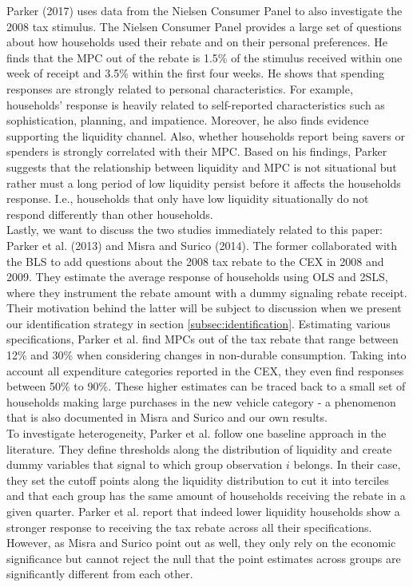 Parker (2017) uses data from the Nielsen Consumer Panel to also investigate the 2008 tax stimulus. The Nielsen Consumer Panel provides a large set of questions about how households used their rebate and on their personal preferences. He finds that the MPC out of the rebate is 1.5\% of the stimulus received within one week of receipt and 3.5\% within the first four weeks. He shows that spending responses are strongly related to personal characteristics. For example, households' response is heavily related to self-reported characteristics such as sophistication, planning, and impatience. Moreover, he also finds evidence supporting the liquidity channel. Also, whether households report being savers or spenders is strongly correlated with their MPC. Based on his findings, Parker suggests that the relationship between liquidity and MPC is not situational but rather must a long period of low liquidity persist before it affects the households response. I.e., households that only have low liquidity situationally do not respond differently than other households. \\
Lastly, we want to discuss the two studies immediately related to this paper: Parker et al. (2013) and Misra and Surico (2014). The former collaborated with the BLS to add questions about the 2008 tax rebate to the CEX in 2008 and 2009. They estimate the average response of households using OLS and 2SLS, where they instrument the rebate amount with a dummy signaling rebate receipt. Their motivation behind the latter will be subject to discussion when we present our identification strategy in section \ref{subsec:identification}. Estimating various specifications, Parker et al. find MPCs out of the tax rebate that range between 12\% and 30\% when considering changes in non-durable consumption. Taking into account all expenditure categories reported in the CEX, they even find responses between 50\% to 90\%. These higher estimates can be traced back to a small set of households making large purchases in the new vehicle category - a phenomenon that is also documented in Misra and Surico and our own results. \\
To investigate heterogeneity, Parker et al. follow one baseline approach in the literature. They define thresholds along the distribution of liquidity and create dummy variables that signal to which group observation $i$ belongs. In their case, they set the cutoff points along the liquidity distribution to cut it into terciles and that each group has the same amount of households receiving the rebate in a given quarter. Parker et al. report that indeed lower liquidity households show a stronger response to receiving the tax rebate across all their specifications. However, as Misra and Surico point out as well, they only rely on the economic significance but cannot reject the null that the point estimates across groups are significantly different from each other. \\
